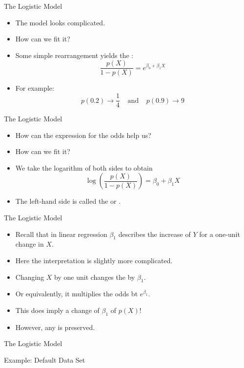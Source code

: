 \documentclass[mathserif, aspectratio=169]{beamer}
\begin{document}
\begin{frame}{The Logistic Model}
	\begin{itemize}
		\item The model looks complicated.
		\item How can we fit it?
		\item Some simple rearrangement yields the :
			\[ \frac{p(X)}{1 - p(X)} = e^{\beta_0 +\beta_1 X} \]
		\item For example:
			\[ p(0.2)\rightarrow\frac{1}{4}\;\;\;\;\text{and}\;\;\;\; p(0.9)\rightarrow 9 \]
	\end{itemize}
\end{frame}

\begin{frame}{The Logistic Model}
	\begin{itemize}
		\item How can the expression for the odds help us?
		\item How can we fit it?
		\item We take the logarithm of both sides to obtain
			\[ \log\left( \frac{p(X)}{1 - p(X)}\right)  = \beta_0 + \beta_1 X \]
		\item The left-hand side is called the  or .
	\end{itemize}
\end{frame}

\begin{frame}{The Logistic Model}
	\begin{itemize}
		\item  Recall that in linear regression $\beta_1$ describes the increase of $Y$ for
			a one-unit change in $X$.
		\item Here the interpretation is slightly more complicated.
		\item Changing $X$ by one unit changes the  by $\beta_1$.
		\item Or equivalently, it multiplies the odds bt $e^{\beta_1}$.
		\item This does  imply a change of $\beta_1$ of $p(X)$!
		\item However, any  is preserved.
	\end{itemize}
\end{frame}

\begin{frame}{The Logistic Model}
\end{frame}

\begin{frame}{Example: Default Data Set}
\end{frame}
\end{document}

